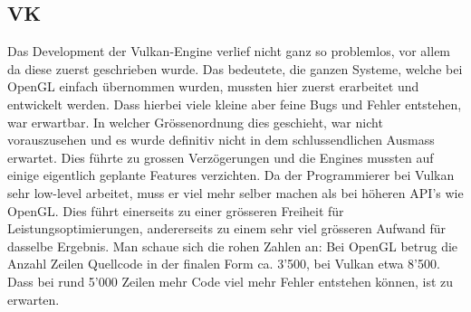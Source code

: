 \documentclass[titlepage, 11pt, a4paper, ngerman]{article}
\begin{document}
\subsection{VK}
Das Development der Vulkan-\gls{Engine} verlief nicht ganz so problemlos, vor allem da diese zuerst geschrieben wurde. Das bedeutete, die ganzen Systeme, welche bei \acrshort{OpenGL} einfach übernommen wurden, mussten hier zuerst erarbeitet und entwickelt werden. Dass hierbei viele kleine aber feine Bugs und Fehler entstehen, war erwartbar. In welcher Grössenordnung dies geschieht, war nicht vorauszusehen und es wurde definitiv nicht in dem schlussendlichen Ausmass erwartet. Dies führte zu grossen Verzögerungen und die \glspl{Engine} mussten auf einige eigentlich geplante Features verzichten. Da der Programmierer bei Vulkan sehr low-level arbeitet, muss er viel mehr selber machen als bei höheren \acrshort{API}'s wie \acrshort{OpenGL}. Dies führt einerseits zu einer grösseren Freiheit für Leistungsoptimierungen, andererseits zu einem sehr viel grösseren Aufwand für dasselbe Ergebnis. Man schaue sich die rohen Zahlen an: Bei \acrshort{OpenGL} betrug die Anzahl Zeilen Quellcode in der finalen Form ca. 3'500, bei Vulkan etwa 8'500. Dass bei rund 5'000 Zeilen mehr Code viel mehr Fehler entstehen können, ist zu erwarten. 
\end{document}
